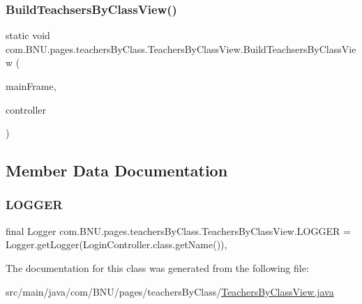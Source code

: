 \subsubsection{\texorpdfstring{Build\+Teachsers\+By\+Class\+View()}{BuildTeachsersByClassView()}}
{\footnotesize\ttfamily static void com.\+B\+N\+U.\+pages.\+teachers\+By\+Class.\+Teachers\+By\+Class\+View.\+Build\+Teachsers\+By\+Class\+View (\begin{DoxyParamCaption}\item[{J\+Frame}]{main\+Frame,  }\item[{\mbox{\hyperlink{classcom_1_1_b_n_u_1_1pages_1_1teachers_by_class_1_1_teachers_by_class_controller}{Teachers\+By\+Class\+Controller}}}]{controller }\end{DoxyParamCaption})\hspace{0.3cm}{\ttfamily [static]}}



\subsection{Member Data Documentation}
\mbox{\label{classcom_1_1_b_n_u_1_1pages_1_1teachers_by_class_1_1_teachers_by_class_view_a231a795167bd2c9e7f1c231a60116609}} 
\subsubsection{\texorpdfstring{L\+O\+G\+G\+ER}{LOGGER}}
{\footnotesize\ttfamily final Logger com.\+B\+N\+U.\+pages.\+teachers\+By\+Class.\+Teachers\+By\+Class\+View.\+L\+O\+G\+G\+ER = Logger.\+get\+Logger(Login\+Controller.\+class.\+get\+Name())\hspace{0.3cm}{\ttfamily [static]}, {\ttfamily [private]}}



The documentation for this class was generated from the following file\+:\begin{DoxyCompactItemize}
\item 
src/main/java/com/\+B\+N\+U/pages/teachers\+By\+Class/\mbox{\hyperlink{_teachers_by_class_view_8java}{Teachers\+By\+Class\+View.\+java}}\end{DoxyCompactItemize}
